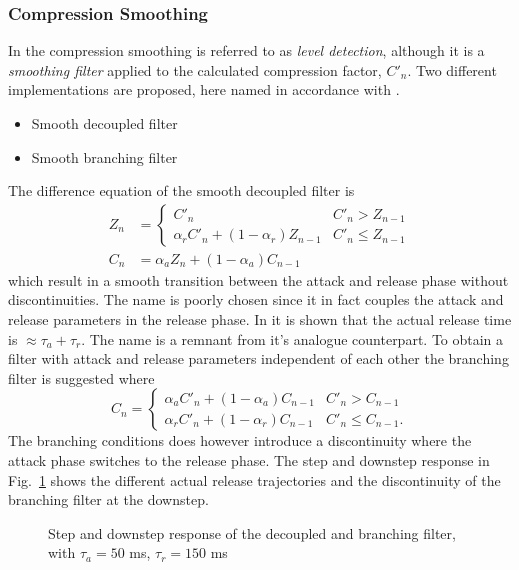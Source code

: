 \documentclass[../main2.tex]{subfiles}
\providecommand{\rootdir}{..}
\begin{document}
 \subsubsection{Compression Smoothing}
In \cite{reiss2012tutorial} the compression smoothing is referred to as \emph{level detection}, although it is a \emph{smoothing filter} applied to the calculated compression factor, $C'_n$. Two different implementations are proposed, here named in accordance with \cite{reiss2012tutorial}.
\begin{itemize}
\item{Smooth decoupled filter}
\item{Smooth branching filter}
\end{itemize}
The difference equation of the smooth decoupled filter is
\begin{equation}
\begin{split}
Z_n &= \begin{cases}
   C'_n								& C'_n > Z_{n-1} \\
    \alpha_{r} C'_n + (1-\alpha_{r}) Z_{n-1} 	& C'_n \leq Z_{n-1}
\end{cases} \\
C_n &= \alpha_{a} Z_n + (1-\alpha_{a}) C_{n-1}
\end{split}
\end{equation}
which result in a smooth transition between the attack and release phase without discontinuities. The name is poorly chosen since it in fact couples the attack and release parameters in the release phase. In \cite{reiss2012tutorial} it is shown that the actual release time is $\approx \tau_a + \tau_r$. The name is a remnant from it's analogue counterpart. To obtain a filter with attack and release parameters independent of each other the branching filter is suggested where 
\begin{equation}
C_n = \begin{cases}
    \alpha_{a} C'_n + (1-\alpha_{a}) C_{n-1} 	& C'_n > C_{n-1} \\
    \alpha_{r} C'_n + (1-\alpha_{r}) C_{n-1} 	& C'_n \leq C_{n-1}.
\end{cases}
\end{equation}
The branching conditions does however introduce a discontinuity where the attack phase switches to the release phase. The step and downstep response in Fig.~\ref{fig:step_reiss_filter} shows the different actual release trajectories and the discontinuity of the branching filter at the downstep.
\begin{figure}
\centerline{}
\caption{Step and downstep response of the decoupled and branching filter, with $\tau_a = 50$ ms, $\tau_r = 150$ ms}
\label{fig:step_reiss_filter}
\end{figure}
\end{document}
